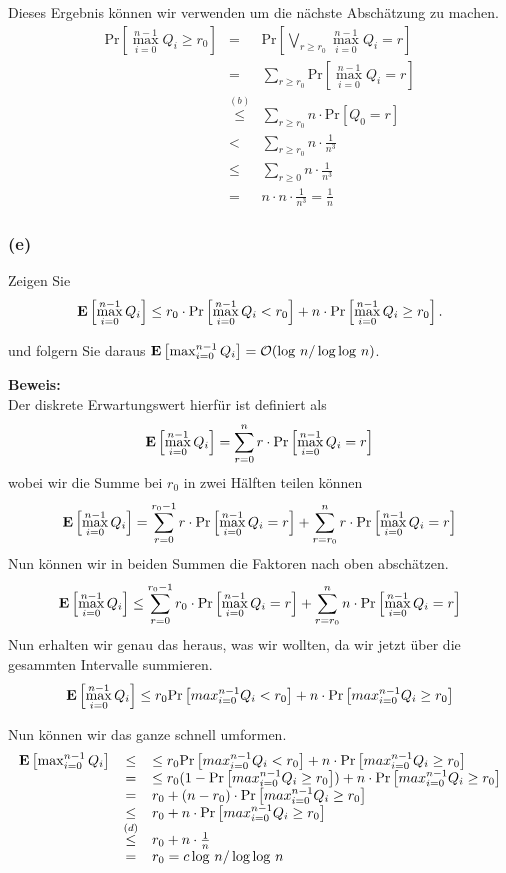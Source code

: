 \documentclass[11pt,a4paper,ngerman]{article}
\newcommand{\erw}[1]{\text{\bfseries E} \left[ #1 \right]}
\newcommand{\prob}[1]{\text{Pr}\left[ #1 \right]}
\begin{document}
Dieses Ergebnis können wir verwenden um die nächste Abschätzung zu machen.
$$\begin{array}{rcl}
	\prob{\max_{i=0}^{n-1} Q_i \geq r_0} &=& \prob{\underset{r \geq r_0}{\bigvee} \max_{i=0}^{n-1} Q_i = r}\\
		&=& \underset{r\geq r_0}{\sum} \prob{\max_{i=0}^{n-1} Q_i = r}\\
		&\stackrel{(b)}{\leq}& \underset{r\geq r_0}{\sum} n \cdot \prob{Q_0 = r}\\
		&<& \underset{r \geq r_0}{\sum} n \cdot \frac{1}{n^3}\\
		&\leq& \underset{r \geq 0}{\sum} n \cdot \frac{1}{n^3}\\
		&=& n \cdot n \cdot \frac{1}{n^3} = \frac{1}{n}
\end{array}$$

\subsubsection*{(e)}
Zeigen Sie
$$
	\erw{\max_{i=0}^{n-1} Q_i} \leq r_0 \cdot \prob{\max_{i=0}^{n-1} Q_i < r_0} + n \cdot \prob{\max_{i=0}^{n-1} Q_i \geq r_0}.
$$

und folgern Sie daraus $\erw{\max_{i=0}^{n-1}Q_i} = \mathcal{O}(\log \, n / \log \log \, n)$.

\noindent\textbf{Beweis:}\\

Der diskrete Erwartungswert hierfür ist definiert als
$$
	\erw{\max_{i=0}^{n-1} Q_i} = \sum_{r=0}^n r \cdot \prob{\max_{i=0}^{n-1} Q_i = r}
$$
wobei wir die Summe bei $r_0$ in zwei Hälften teilen können
$$
	\erw{\max_{i=0}^{n-1} Q_i} = \sum_{r=0}^{r_0-1}r \cdot \prob{\max_{i=0}^{n-1} Q_i = r} + \sum_{r= r_0}^n  r \cdot \prob{\max_{i=0}^{n-1} Q_i = r}
$$
Nun können wir in beiden Summen die Faktoren nach oben abschätzen.
$$
	\erw{\max_{i=0}^{n-1} Q_i} \leq \sum_{r=0}^{r_0-1}r_0 \cdot \prob{\max_{i=0}^{n-1} Q_i = r} + \sum_{r= r_0}^n  n \cdot \prob{\max_{i=0}^{n-1} Q_i = r}
$$
Nun erhalten wir genau das heraus, was wir wollten, da wir jetzt über die gesammten Intervalle summieren.
$$
	\erw{\max_{i=0}^{n-1}Q_i} \leq r_0 \prob{max_{i=0}^{n-1} Q_i < r_0} + n \cdot \prob{max_{i=0}^{n-1} Q_i \geq r_0}
$$

Nun können wir das ganze schnell umformen.
$$\begin{array}{rcl}
	\erw{\max_{i=0}^{n-1}Q_i} &\leq& \leq r_0 \prob{max_{i=0}^{n-1} Q_i < r_0} + n \cdot \prob{max_{i=0}^{n-1} Q_i \geq r_0}\\
		&=& \leq r_0 (1 - \prob{max_{i=0}^{n-1} Q_i \geq r_0}) + n \cdot \prob{max_{i=0}^{n-1} Q_i \geq r_0}\\
		&=& r_0  + (n - r_0) \cdot  \prob{max_{i=0}^{n-1} Q_i \geq r_0}\\
		&\leq& r_0 + n \cdot  \prob{max_{i=0}^{n-1} Q_i \geq r_0}\\
		&\stackrel{(d)}{\leq}& r_0 + n \cdot \frac{1}{n}\\
		&=& r_0 = c \log \, n / \log \log \, n
\end{array}$$
\end{document}
